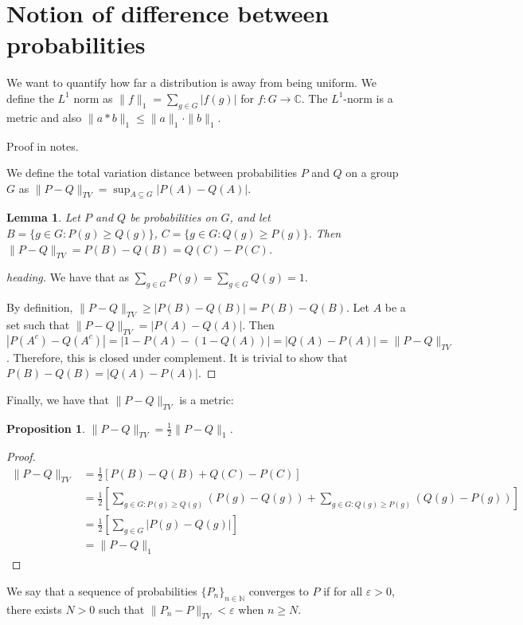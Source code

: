 \documentclass[]{article}
\newtheorem{proposition}[theorem]{Proposition}
\newtheorem{lemma}[theorem]{Lemma}
\theoremstyle{definition}
\numberwithin{theorem}{section}
\numberwithin{equation}{section}
\begin{document}
\section{Notion of difference between probabilities}
We want to quantify how far a distribution is away from being uniform. We define the $L^1$ norm as $\|f\|_1 = \sum_{g \in G} |f(g)|$ for $f : G \rightarrow \mathbb{C}$. The $L^1$-norm is a metric and also $\|a \ast b\|_1 \leq \|a\|_1 \cdot \|b\|_1$. 

Proof in notes.

We define the total variation distance between probabilities $P$ and $Q$ on a group $G$ as $\| P - Q\|_{TV} = \sup_{A \subseteq G} |P(A) - Q(A)|$. 

\begin{lemma}
	Let $P$ and $Q$ be probabilities on $G$, and let $B = \lbrace g \in G : P(g) \geq Q(g) \rbrace$, $C = \lbrace g \in G : Q(g) \geq P(g) \rbrace$.
	Then $\|P - Q \|_{TV} = P(B) - Q(B) = Q(C) - P(C)$.
\end{lemma}
\begin{proof}[heading]
	We have that as $\sum_{g \in G} P(g) = \sum_{g \in G} Q(g) = 1$. 
	
	
	By definition, $\|P - Q\|_{TV} \geq |P(B) - Q(B)| = P(B) - Q(B)$.
	Let $A$ be a set such that $\|P - Q\|_{TV} = |P(A) - Q(A)|.$ Then $|P(A^c) - Q(A^c)| = |1 - P(A) - (1 - Q(A))| = |Q(A) - P(A)| = \|P - Q \|_{TV}$. Therefore, this is closed under complement. It is trivial to show that $P(B) - Q(B) = |Q(A) - P(A)|$. 
\end{proof}
Finally, we have that $\|P - Q \|_{TV}$ is a metric:
\begin{proposition}
	\label{prop:distribution difference equality}
	$\|P - Q\|_{TV} = \frac{1}{2} \|P - Q \|_1$. 
\end{proposition}

\begin{proof}
	\begin{align*}
		\|P - Q\|_{TV} &= \frac{1}{2}[P(B) - Q(B) + Q(C) - P(C)]\\
		&=\frac{1}{2}\left[ \sum_{g \in G : P(g) \geq Q(g)} (P(g) - Q(g)) + \sum_{g \in G : Q(g) \geq P(g)} (Q(g) - P(g)) \right]\\
		&= \frac{1}{2}\left[ \sum_{g \in G}|P(g) - Q(g)| \right]\\
		&= \|P - Q\|_1
	\end{align*}
\end{proof}

We say that a sequence of probabilities $\lbrace P_n \rbrace_{n \in \mathbb{N}}$ converges to $P$ if for all $\varepsilon > 0$, there exists $N > 0$ such that $\|P_n - P \|_{TV} < \varepsilon$ when $n \geq N$. 
\end{document}
